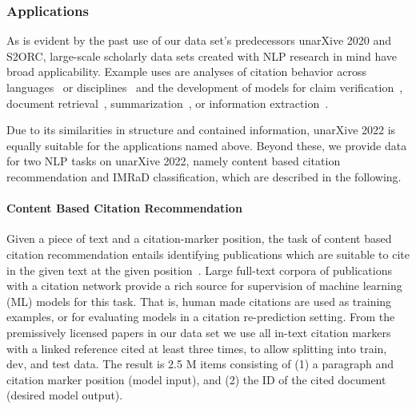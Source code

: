 
\subsubsection{Applications}\label{sec:applications}


As is evident by the past use of our data set's predecessors unarXive 2020 and S2ORC, large-scale scholarly data sets created with NLP research in mind have broad applicability. Example uses are analyses of citation behavior across languages~\cite{Saier2021} or disciplines~\cite{astrocit} and the development of models for claim verification~\cite{wadden2020}, document retrieval~\cite{multi_objective}, summarization~\cite{citesum}, or information extraction~\cite{viswanathan2021}.

Due to its similarities in structure and contained information, unarXive 2022 is equally suitable for the applications named above. Beyond these, we provide data for two NLP tasks on unarXive 2022, namely content based citation recommendation and IMRaD classification, which are described in the following.

\paragraph{Content Based Citation Recommendation}
Given a piece of text and a citation-marker position, the task of content based citation recommendation entails identifying publications which are suitable to cite in the given text at the given position~\cite{Bhagavatula2018,Faerber2020a}. Large full-text corpora of publications with a citation network provide a rich source for supervision of machine learning (ML) models for this task. That is, human made citations are used as training examples, or for evaluating models in a citation re-prediction setting.
From the premissively licensed papers in our data set we use all in-text citation markers with a linked reference cited at least three times, to allow splitting into train, dev, and test data.
The result is 2.5 M items consisting of (1) a paragraph and citation marker position (model input), and (2) the ID of the cited document (desired model output). %

